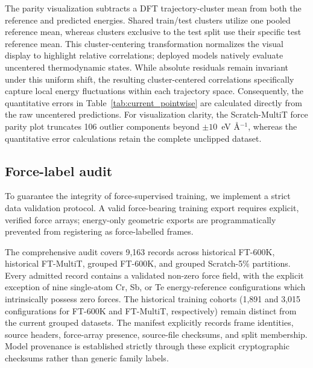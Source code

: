 \documentclass[pdflatex,sn-mathphys-num]{sn-jnl}
\newcommand{\file}[1]{\texttt{\detokenize{#1}}}
\begin{document}
\begin{table}[htbp]
\centering\small
\caption{\textbf{Current uncentred held-out errors.} Energy RMSE in meV atom$^{-1}$ and Cartesian force-component RMSE in meV \AA$^{-1}$, reported as means and sample standard deviations over training seeds 123, 234, and 345. The underlying 24 train/test evaluations are retained in the current-release source table. Because the thermal conditions utilize distinct test compositions, their respective metrics independently characterize model fidelity within each specific data domain.}
\label{tab:current_pointwise}

\end{table}

The parity visualization subtracts a DFT trajectory-cluster mean from both the reference and predicted energies. Shared train/test clusters utilize one pooled reference mean, whereas clusters exclusive to the test split use their specific test reference mean. This cluster-centering transformation normalizes the visual display to highlight relative correlations; deployed models natively evaluate uncentered thermodynamic states. While absolute residuals remain invariant under this uniform shift, the resulting cluster-centered correlations specifically capture local energy fluctuations within each trajectory space. Consequently, the quantitative errors in Table~\ref{tab:current_pointwise} are calculated directly from the raw uncentered predictions. For visualization clarity, the Scratch-MultiT force parity plot truncates 106 outlier components beyond $\pm10$~eV \AA$^{-1}$, whereas the quantitative error calculations retain the complete unclipped dataset.

\subsection{Force-label audit}\label{sec:force_audit}
To guarantee the integrity of force-supervised training, we implement a strict data validation protocol. A valid force-bearing training export requires explicit, verified force arrays; energy-only geometric exports are programmatically prevented from registering as force-labelled frames.

The comprehensive audit covers 9,163 records across historical FT-600K, historical FT-MultiT, grouped FT-600K, and grouped Scratch-5\% partitions. Every admitted record contains a validated non-zero force field, with the explicit exception of nine single-atom Cr, Sb, or Te \file{IsolatedAtom} energy-reference configurations which intrinsically possess zero forces. The historical training cohorts (1,891 and 3,015 configurations for FT-600K and FT-MultiT, respectively) remain distinct from the current grouped datasets. The manifest explicitly records frame identities, source headers, force-array presence, source-file checksums, and split membership. Model provenance is established strictly through these explicit cryptographic checksums rather than generic family labels.
\end{document}
